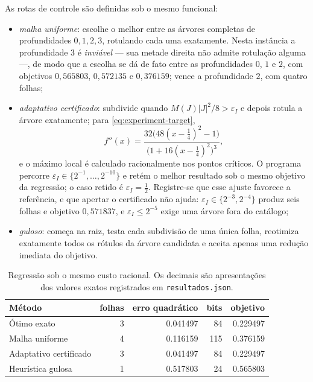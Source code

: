 \documentclass[11pt,a4paper]{article}
\theoremstyle{definition}
\theoremstyle{remark}
\begin{document}
As rotas de controle são definidas sob o mesmo funcional:
\begin{itemize}[leftmargin=1.7em]
 \item \emph{malha uniforme}: escolhe o melhor entre as árvores completas de
 profundidades $0,1,2,3$, rotulando cada uma exatamente. Nesta instância a
 profundidade $3$ é \emph{inviável} --- sua metade direita não admite
 rotulação alguma ---, de modo que a escolha se dá de fato entre as
 profundidades $0$, $1$ e $2$, com objetivos $0{,}565803$, $0{,}572135$ e
 $0{,}376159$; vence a profundidade $2$, com quatro folhas;
 \item \emph{adaptativo certificado}: subdivide quando
 $M(J)|J|^2/8>\varepsilon_I$ e depois rotula a árvore exatamente; para
 \eqref{eq:experiment-target},
 \[
 f''(x)=
 \frac{32\bigl(48(x-\tfrac14)^2-1\bigr)}
      {\bigl(1+16(x-\tfrac14)^2\bigr)^3},
 \]
 e o máximo local é calculado racionalmente nos pontos críticos. O programa
 percorre $\varepsilon_I\in\{2^{-1},\dots,2^{-10}\}$ e retém o melhor
 resultado sob o mesmo objetivo da regressão; o caso retido é
 $\varepsilon_I=\tfrac12$. Registre-se que esse ajuste favorece a referência,
 e que apertar o certificado não ajuda: $\varepsilon_I\in\{2^{-3},2^{-4}\}$
 produz seis folhas e objetivo $0{,}571837$, e $\varepsilon_I\le2^{-5}$ exige
 uma árvore fora do catálogo;
 \item \emph{guloso}: começa na raiz, testa cada subdivisão de uma única folha,
 reotimiza exatamente todos os rótulos da árvore candidata e aceita apenas
 uma redução imediata do objetivo.
\end{itemize}

\begin{table}[t]
 \centering
 \caption{Regressão sob o mesmo custo racional. Os decimais são
 apresentações dos valores exatos registrados em
 \texttt{resultados.json}.}
 \label{tab:selector-comparison}
 \small
 \begin{tabular}{lrrrr}
\toprule
Método & folhas & erro quadrático & bits & objetivo \\
\midrule
Ótimo exato & 3 & 0.041497 & 84 & 0.229497 \\
Malha uniforme & 4 & 0.116159 & 115 & 0.376159 \\
Adaptativo certificado & 3 & 0.041497 & 84 & 0.229497 \\
Heurística gulosa & 1 & 0.517803 & 24 & 0.565803 \\
\bottomrule
\end{tabular}

\end{table}
\end{document}
